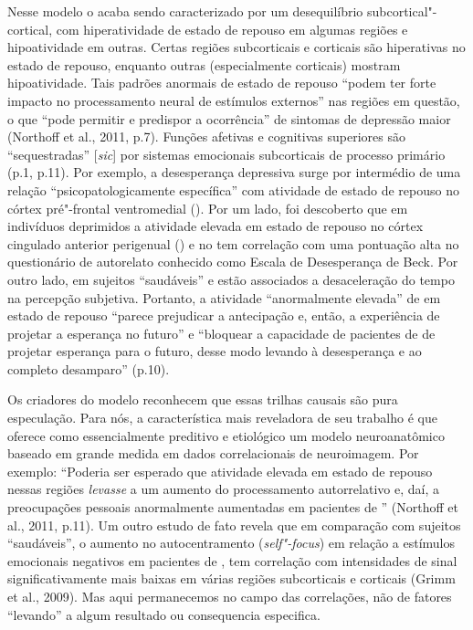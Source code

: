 Nesse modelo o  acaba sendo caracterizado por um desequilíbrio
subcortical"-cortical, com hiperatividade de estado de repouso em algumas
regiões e hipoatividade em outras. Certas regiões subcorticais e
corticais são hiperativas no estado de repouso, enquanto outras
(especialmente corticais) mostram hipoatividade. Tais padrões anormais
de estado de repouso ``podem ter forte impacto no processamento neural
de estímulos externos'' nas regiões em questão, o que ``pode permitir e
predispor a ocorrência'' de sintomas de depressão maior (Northoff et
al., 2011, p.7). Funções afetivas e cognitivas superiores são
``sequestradas'' {[}\emph{sic}{]} por sistemas emocionais subcorticais
de processo primário (p.1, p.11). Por exemplo, a desesperança depressiva
surge por intermédio de uma relação ``psicopatologicamente específica''
com atividade de estado de repouso no córtex pré"-frontal ventromedial
(). Por um lado, foi descoberto que em indivíduos deprimidos a
atividade elevada em estado de repouso no córtex cingulado anterior
perigenual () e no  tem correlação com uma pontuação alta no
questionário de autorelato conhecido como Escala de Desesperança de
Beck. Por outro lado, em sujeitos ``saudáveis''  e  estão
associados a desaceleração do tempo na percepção subjetiva. Portanto, a
atividade ``anormalmente elevada'' de  em estado de repouso
``parece prejudicar a antecipação e, então, a experiência de projetar a
esperança no futuro'' e ``bloquear a capacidade de pacientes de  de
projetar esperança para o futuro, desse modo levando à desesperança e ao
completo desamparo'' (p.10).

Os criadores do modelo reconhecem que essas trilhas causais são pura
especulação. Para nós, a característica mais reveladora de seu trabalho
é que oferece como essencialmente preditivo e etiológico um modelo
neuroanatômico baseado em grande medida em dados correlacionais de
neuroimagem. Por exemplo: ``Poderia ser esperado que atividade elevada
em estado de repouso nessas regiões \emph{levasse} a um aumento do
processamento autorrelativo e, daí, a preocupações pessoais anormalmente
aumentadas em pacientes de '' (Northoff et al., 2011, p.11). Um outro
estudo de fato revela que em comparação com sujeitos ``saudáveis'', o
aumento no autocentramento (\emph{self"-focus}) em relação a estímulos
emocionais negativos em pacientes de , tem correlação com
intensidades de sinal significativamente mais baixas em várias regiões
subcorticais e corticais (Grimm et al., 2009). Mas aqui permanecemos no
campo das correlações, não de fatores ``levando'' a algum resultado ou
consequencia especifica.

